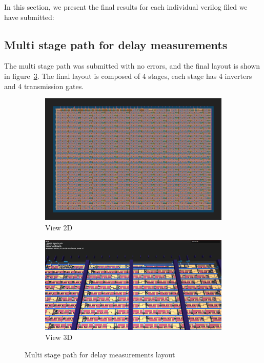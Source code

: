 In this section, we present the final results for each individual verilog filed we have submitted:



\subsection{Multi stage path for delay measurements}
The multi stage path was submitted with no errors, and the final layout is shown in figure\ \ref{fig:delay_Layout}. The final layout is composed of 4 stages, each stage has 4 inverters and 4 transmission gates.
\begin{figure}[H]
    \centering
    \begin{subfigure}[b]{0.45\textwidth}
        \includegraphics[width=\linewidth]{Pictures/Result_Delay_2D_View.png}
        \caption{View 2D}\label{fig:delay_2D}
    \end{subfigure}
    \begin{subfigure}[b]{0.45\textwidth}
        \includegraphics[width=\linewidth]{Pictures/Result_Delay_3D_View.png}
        \caption{View 3D}\label{fig:delay_3D}
    \end{subfigure}
    \caption{Multi stage path for delay measurements layout}\label{fig:delay_Layout}
\end{figure}

